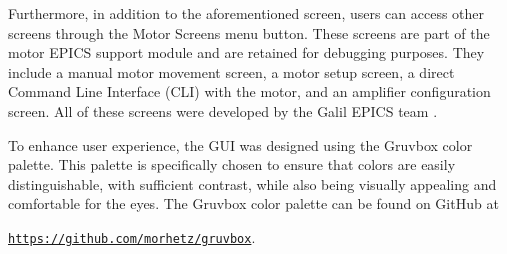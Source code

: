     Furthermore, in addition to the aforementioned screen, users can access other screens through the Motor Screens menu button.
    These screens are part of the motor EPICS support module and are retained for debugging purposes.
    They include a manual motor movement screen, a motor setup screen, a direct Command Line Interface (CLI) with the motor, and an amplifier configuration screen.
    All of these screens were developed by the Galil EPICS team \cite{farnswort2009}.

    To enhance user experience, the GUI was designed using the Gruvbox color palette.
    This palette is specifically chosen to ensure that colors are easily distinguishable, with sufficient contrast, while also being visually appealing and comfortable for the eyes.
    The Gruvbox color palette can be found on GitHub at

    \begin{center}
        \hyperlink{https://github.com/morhetz/gruvbox}{\texttt{https://github.com/morhetz/gruvbox}}.
    \end{center}
